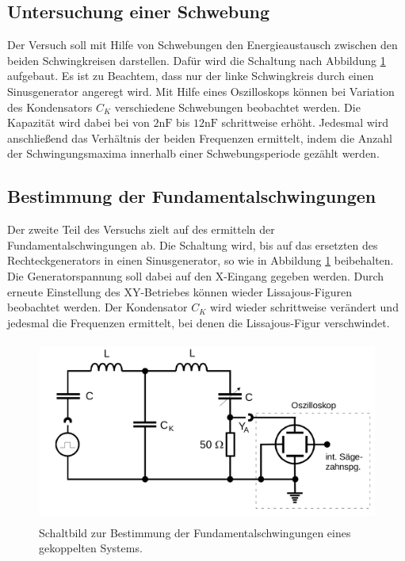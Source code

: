 \subsection{Untersuchung einer Schwebung} 
\label{sub:Untersuchung einer Schwebung}



Der Versuch soll mit Hilfe von Schwebungen den Energieaustausch zwischen den beiden Schwingkreisen darstellen.
Dafür wird die Schaltung nach Abbildung \ref{fig:bild6} aufgebaut. Es ist zu Beachtem, dass nur der linke Schwingkreis durch einen Sinusgenerator angeregt wird.
Mit Hilfe eines Oszilloskops können bei Variation des 
Kondensators $C_K$ verschiedene Schwebungen beobachtet werden. Die Kapazität wird dabei bei von $2\si{\nano\farad}$  bis $12\si{\nano\farad}$
schrittweise erhöht. Jedesmal wird anschließend das Verhältnis der beiden Frequenzen ermittelt, indem die Anzahl der Schwingungsmaxima innerhalb einer Schwebungsperiode 
gezählt werden.


\subsection{Bestimmung der Fundamentalschwingungen}
\label{sub:Bestimmung der Fundamentalschwingungen}



Der zweite Teil des Versuchs zielt auf des ermitteln der Fundamentalschwingungen ab. Die Schaltung wird, bis auf das ersetzten des Rechteckgenerators in
einen Sinusgenerator, so wie in Abbildung \ref{fig:bild6} beibehalten. Die Generatorspannung soll dabei auf den X-Eingang gegeben werden.
Durch erneute Einstellung des XY-Betriebes können wieder Lissajous-Figuren beobachtet werden. Der Kondensator $C_K$ wird wieder schrittweise verändert und jedesmal die Frequenzen ermittelt, bei 
denen die Lissajous-Figur verschwindet. 


\begin{figure}

    \centering
    \includegraphics[height=6.0cm]{data/Bild6.png}
    \caption{Schaltbild zur Bestimmung der Fundamentalschwingungen eines gekoppelten Systems.}
    \label{fig:bild6}
\end{figure}


